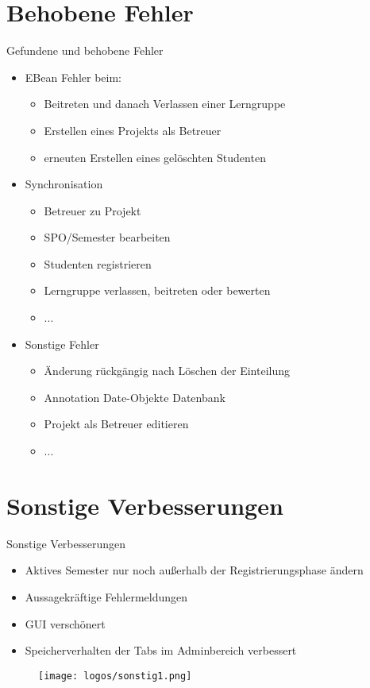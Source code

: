 \documentclass[18pt, xcolor=table]{beamer}
\begin{document}
\section{Behobene Fehler}
\begin{frame}{Gefundene und behobene Fehler}
\begin{itemize}
  \item EBean Fehler beim:
 	\begin{itemize}
 		\item Beitreten und danach Verlassen einer Lerngruppe
 		\item Erstellen eines Projekts als Betreuer
 		\item erneuten Erstellen eines gelöschten Studenten
 	\end{itemize}
  \item Synchronisation
  	\begin{itemize}
 		\item Betreuer zu Projekt
 		\item SPO/Semester bearbeiten
 		\item Studenten registrieren
 		\item Lerngruppe verlassen, beitreten oder bewerten
 		\item ...
 	\end{itemize}
 	\item Sonstige Fehler
 	\begin{itemize}
 		\item Änderung rückgängig nach Löschen der Einteilung
 		\item Annotation Date-Objekte Datenbank
 		\item Projekt als Betreuer editieren
 		\item ...
 	\end{itemize}
\end{itemize}
\end{frame}

\section{Sonstige Verbesserungen}
\begin{frame}{Sonstige Verbesserungen}
\begin{itemize}
  \item Aktives Semester nur noch außerhalb der Registrierungsphase ändern
  \item Aussagekräftige Fehlermeldungen
  \item GUI verschönert
  \item Speicherverhalten der Tabs im Adminbereich verbessert
\end{itemize}
\begin{figure}
  	\texttt{[image: logos/sonstig1.png]}
  \end{figure}
\end{frame}
\end{document}
